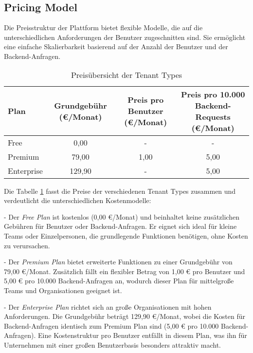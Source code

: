 \subsection{Pricing Model}
Die Preisstruktur der Plattform bietet flexible Modelle, die auf die unterschiedlichen Anforderungen der Benutzer zugeschnitten sind. 
Sie ermöglicht eine einfache Skalierbarkeit basierend auf der Anzahl der Benutzer und der Backend-Anfragen.

\begin{table}[h!]
\centering
\caption{Preisübersicht der Tenant Types}
\begin{tabular}{|l|c|c|c|}
\hline
\textbf{Plan}         & \textbf{Grundgebühr (€/Monat)} & \textbf{Preis pro Benutzer (€/Monat)} & \textbf{Preis pro 10.000 Backend-Requests (€/Monat)} \\ \hline
Free                  & 0,00                          & -                                    & -                                                   \\ \hline
Premium               & 79,00                         & 1,00                                 & 5,00                                                \\ \hline
Enterprise            & 129,90                        & -                                    & 5,00                                                \\ \hline
\end{tabular}
\label{tab:pricing}
\end{table}

Die Tabelle \ref{tab:pricing} fasst die Preise der verschiedenen Tenant Types zusammen und verdeutlicht die unterschiedlichen Kostenmodelle:

- Der \textit{Free Plan} ist kostenlos (0,00 €/Monat) und beinhaltet keine zusätzlichen Gebühren für Benutzer oder Backend-Anfragen. 
Er eignet sich ideal für kleine Teams oder Einzelpersonen, die grundlegende Funktionen benötigen, ohne Kosten zu verursachen.
  
- Der \textit{Premium Plan} bietet erweiterte Funktionen zu einer Grundgebühr von 79,00 €/Monat. 
Zusätzlich fällt ein flexibler Betrag von 1,00 € pro Benutzer und 5,00 € pro 10.000 Backend-Anfragen an, wodurch dieser Plan für mittelgroße Teams und Organisationen geeignet ist.

- Der \textit{Enterprise Plan} richtet sich an große Organisationen mit hohen Anforderungen. 
Die Grundgebühr beträgt 129,90 €/Monat, wobei die Kosten für Backend-Anfragen identisch zum Premium Plan sind (5,00 € pro 10.000 Backend-Anfragen). 
Eine Kostenstruktur pro Benutzer entfällt in diesem Plan, was ihn für Unternehmen mit einer großen Benutzerbasis besonders attraktiv macht.

